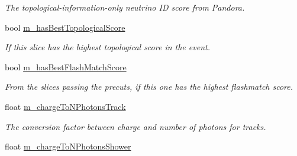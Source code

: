 \begin{DoxyCompactItemize}
\begin{DoxyCompactList}\small\item\em The topological-\/information-\/only neutrino I\-D score from Pandora. \end{DoxyCompactList}\item 
\hypertarget{classflashmatch_1_1FlashMatchingTool_1_1SliceCandidate_a07d1352f08cbd7bba286ca9a08e6660b}{bool \hyperlink{classflashmatch_1_1FlashMatchingTool_1_1SliceCandidate_a07d1352f08cbd7bba286ca9a08e6660b}{m\-\_\-has\-Best\-Topological\-Score}}\label{classflashmatch_1_1FlashMatchingTool_1_1SliceCandidate_a07d1352f08cbd7bba286ca9a08e6660b}

\begin{DoxyCompactList}\small\item\em If this slice has the highest topological score in the event. \end{DoxyCompactList}\item 
\hypertarget{classflashmatch_1_1FlashMatchingTool_1_1SliceCandidate_a7358819de86b8111040e6b05be898630}{bool \hyperlink{classflashmatch_1_1FlashMatchingTool_1_1SliceCandidate_a7358819de86b8111040e6b05be898630}{m\-\_\-has\-Best\-Flash\-Match\-Score}}\label{classflashmatch_1_1FlashMatchingTool_1_1SliceCandidate_a7358819de86b8111040e6b05be898630}

\begin{DoxyCompactList}\small\item\em From the slices passing the precuts, if this one has the highest flashmatch score. \end{DoxyCompactList}\item 
\hypertarget{classflashmatch_1_1FlashMatchingTool_1_1SliceCandidate_ae0a85f85fef8f21b6e48188d75d931c7}{float \hyperlink{classflashmatch_1_1FlashMatchingTool_1_1SliceCandidate_ae0a85f85fef8f21b6e48188d75d931c7}{m\-\_\-charge\-To\-N\-Photons\-Track}}\label{classflashmatch_1_1FlashMatchingTool_1_1SliceCandidate_ae0a85f85fef8f21b6e48188d75d931c7}

\begin{DoxyCompactList}\small\item\em The conversion factor between charge and number of photons for tracks. \end{DoxyCompactList}\item 
\hypertarget{classflashmatch_1_1FlashMatchingTool_1_1SliceCandidate_a82d6850177d95926ed59ec4722c37cba}{float \hyperlink{classflashmatch_1_1FlashMatchingTool_1_1SliceCandidate_a82d6850177d95926ed59ec4722c37cba}{m\-\_\-charge\-To\-N\-Photons\-Shower}}\label{classflashmatch_1_1FlashMatchingTool_1_1SliceCandidate_a82d6850177d95926ed59ec4722c37cba}


\end{DoxyCompactItemize}
